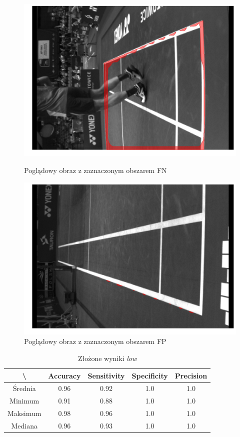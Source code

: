 \begin{figure}[!htb]
    \includegraphics[width=\linewidth]{original_fn_1564911595553287247.jpg}
    \caption{Poglądowy obraz z zaznaczonym obszarem FN}
  \endminipage\hfill
    \includegraphics[width=\linewidth]{original_fp_1564953159296706208_5.jpg}
    \caption{Poglądowy obraz z zaznaczonym obszarem FP}
  \endminipage\hfill
\end{figure}

\vspace{1cm}

\begin{table}[!h]
	\centering
	\caption{Złożone wyniki \textit{low}}
	\vspace{6pt}
	{\footnotesize
		\begin{tabular}{|c|c|c|c|c|}
			\hline \textbackslash & Accuracy & Sensitivity & Specificity & Precision \\
      \hline Średnia & 0.96 & 0.92 & 1.0 & 1.0 \\
      \hline Minimum & 0.91 & 0.88 & 1.0 & 1.0 \\
      \hline Maksimum & 0.98 & 0.96 & 1.0 & 1.0 \\
      \hline Mediana & 0.96 & 0.93 & 1.0 & 1.0 \\
      \hline
		\end{tabular}
	}
	\vspace{0pt}
\end{table}

